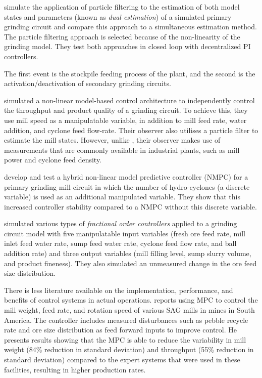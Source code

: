 \cite{olivier_dual_2012} simulate the application of particle filtering to the estimation of both model states and parameters (known as \textit{dual estimation}) of a simulated primary grinding circuit and compare this approach to a simultaneous estimation method. The particle filtering approach is selected because of the non-linearity of the grinding model. They test both approaches in closed loop with decentralized PI controllers.

The first event is the stockpile feeding process of the plant, and the second is the activation/deactivation of secondary grinding circuits.

\cite{le_roux_throughput_2016} simulated a non-linear model-based control architecture to independently control the throughput and product quality of a grinding circuit. To achieve this, they use mill speed as a manipulatable variable, in addition to mill feed rate, water addition, and cyclone feed flow-rate. Their observer also utilises a particle filter to estimate the mill states. However, unlike \cite{olivier_dual_2012}, their observer makes use of measurements that are commonly available in industrial plants, such as mill power and cyclone feed density.

\cite{botha_hybrid_2018} develop and test a hybrid non-linear model predictive controller (NMPC) for a primary grinding mill circuit in which the number of hydro-cyclones (a discrete variable) is used as an additional manipulated variable. They show that this increased controller stability compared to a NMPC without this discrete variable.

\cite{aguila-camacho_control_2017} simulated various types of \textit{fractional order controllers} applied to a grinding circuit model with five manipulatable input variables (fresh ore feed rate, mill inlet feed water rate, sump feed water rate, cyclone feed flow rate, and ball addition rate) and three output variables (mill filling level, sump slurry volume, and product fineness). They also simulated an unmeasured change in the ore feed size distribution.

There is less literature available on the implementation, performance, and benefits of control systems in actual operations. \cite{gough_sag_2015} reports using MPC to control the mill weight, feed rate, and rotation speed of various SAG mills in mines in South America. The controller includes measured disturbances such as pebble recycle rate and ore size distribution as feed forward inputs to improve control. He presents results showing that the MPC is able to reduce the variability in mill weight (84\% reduction in standard deviation) and throughput (55\% reduction in standard deviation) compared to the expert systems that were used in these facilities, resulting in higher production rates.

